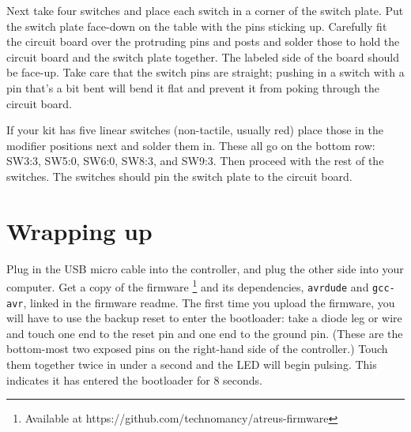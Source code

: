 \documentclass{article}
\begin{document}
\vspace{1em}

Next take four switches and place each switch in a corner of the
switch plate. Put the switch plate face-down on the table with the
pins sticking up. Carefully fit the circuit board over the protruding
pins and posts and solder those to hold the circuit board and the
switch plate together. The labeled side of the board should be
face-up. Take care that the switch pins are straight; pushing in a
switch with a pin that's a bit bent will bend it flat and prevent it
from poking through the circuit board.

\vspace{1em}

If your kit has five linear switches (non-tactile, usually red) place
those in the modifier positions next and solder them in. These all go
on the bottom row: SW3:3, SW5:0, SW6:0, SW8:3, and SW9:3. Then proceed
with the rest of the switches. The switches should pin the switch
plate to the circuit board.

\vspace{1em}
\noindent{}
\vspace{1em}

\section{Wrapping up}

Plug in the USB micro cable into the controller, and plug the other
side into your computer. Get a copy of the
firmware \footnote{Available at
  https://github.com/technomancy/atreus-firmware} and its
dependencies, \texttt{avrdude} and \texttt{gcc-avr}, linked in the
firmware readme. The first time you upload the firmware, you will have
to use the backup reset to enter the bootloader: take a diode leg or
wire and touch one end to the reset pin and one end to the ground
pin. (These are the bottom-most two exposed pins on the right-hand
side of the controller.) Touch them together twice in under a second
and the LED will begin pulsing. This indicates it has entered the
bootloader for 8 seconds.
\end{document}
